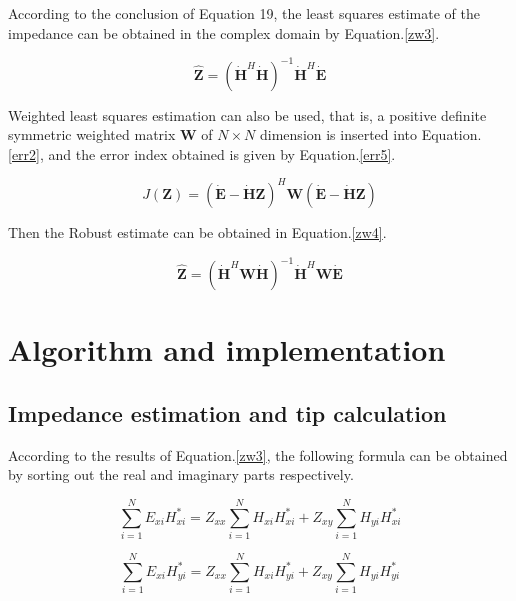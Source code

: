\documentclass[9pt,a4paper,twoside]{rho-class/rho}
\begin{document}
According to the conclusion of Equation 19, the least squares estimate of the impedance can be obtained in the complex domain by Equation.\eqref{zw3}.

\begin{equation}
    \label{zw3}
    \hat{\bm{Z}} = (\dot{\mathbf{H}}^H \dot{\mathbf{H}})^{-1}\dot{\mathbf{H}}^H\dot{\bm{E}}
\end{equation}

Weighted least squares estimation can also be used, that is, a positive definite symmetric weighted matrix $\mathbf{W}$ of $N \times N$ dimension is inserted into Equation.\eqref{err2}, and the error index obtained is given by Equation.\eqref{err5}.

\begin{equation}
    \label{err5}
    J(\bm{Z})=(\dot{\bm{E}}-\dot{\mathbf{H}}\bm{Z})^H\mathbf{W}(\dot{\bm{E}}-\dot{\mathbf{H}}\bm{Z})
\end{equation}

Then the Robust estimate can be obtained in Equation.\eqref{zw4}.

\begin{equation}
    \label{zw4}
    \hat{\bm{Z}}=(\dot{\mathbf{H}}^H \mathbf{W} \dot{\mathbf{H}})^{-1}\dot{\mathbf{H}}^H\mathbf{W}\dot{\bm{E}}
\end{equation}

\section{Algorithm and implementation}

\subsection{Impedance estimation and tip calculation}

According to the results of Equation.\eqref{zw3}, the following formula can be obtained by sorting out the real and imaginary parts respectively.

\begin{equation}
    \label{pow1}
    \sum^N_{i=1}E_{xi}H_{xi}^\ast=Z_{xx}\sum^{N}_{i=1}H_{xi}H_{xi}^\ast+Z_{xy}\sum^N_{i=1}H_{yi}H_{xi}^\ast
\end{equation}

\begin{equation}
    \label{pow2}
    \sum^N_{i=1}E_{xi}H_{yi}^\ast=Z_{xx}\sum^N_{i=1}H_{xi}H_{yi}^\ast+Z_{xy}\sum^N_{i=1}H_{yi}H_{yi}^\ast
\end{equation}
\end{document}
